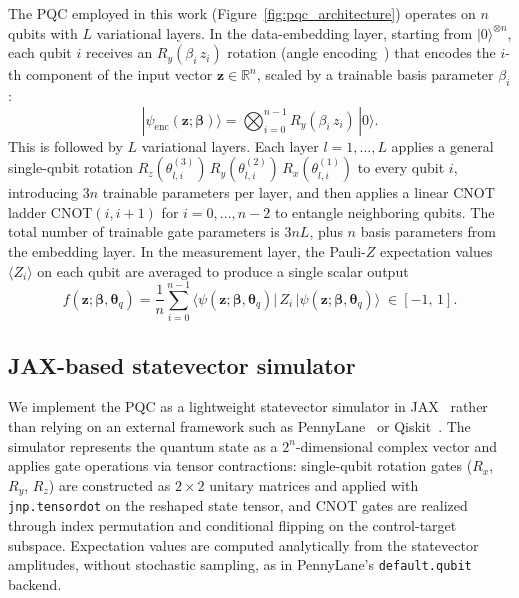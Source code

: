 \documentclass[11pt,a4paper]{article}
\begin{document}
The PQC employed in this work (Figure~\ref{fig:pqc_architecture}) operates on $n$ qubits with $L$ variational layers. In the data-embedding layer, starting from $|0\rangle^{\otimes n}$, each qubit $i$ receives an $R_y(\beta_i\, z_i)$ rotation (angle encoding~\citep{schuld2021machine}) that encodes the $i$-th component of the input vector $\mathbf{z} \in \mathbb{R}^n$, scaled by a trainable basis parameter $\beta_i$:
\begin{equation}
  |\psi_\mathrm{enc}(\mathbf{z};\boldsymbol{\beta})\rangle = \bigotimes_{i=0}^{n-1} R_y(\beta_i\, z_i)\,|0\rangle.
\end{equation}
This is followed by $L$ variational layers. Each layer $l = 1, \ldots, L$ applies a general single-qubit rotation $R_z(\theta^{(3)}_{l,i})\, R_y(\theta^{(2)}_{l,i})\, R_x(\theta^{(1)}_{l,i})$ to every qubit $i$, introducing $3n$ trainable parameters per layer, and then applies a linear CNOT ladder $\text{CNOT}(i, i{+}1)$ for $i = 0, \ldots, n{-}2$ to entangle neighboring qubits. The total number of trainable gate parameters is $3nL$, plus $n$ basis parameters from the embedding layer. In the measurement layer, the Pauli-$Z$ expectation values $\langle Z_i \rangle$ on each qubit are averaged to produce a single scalar output
\begin{equation}
  f(\mathbf{z}; \boldsymbol{\beta}, \boldsymbol{\theta}_q)
  = \frac{1}{n} \sum_{i=0}^{n-1} \langle\psi(\mathbf{z}; \boldsymbol{\beta}, \boldsymbol{\theta}_q)|\, Z_i \,|\psi(\mathbf{z}; \boldsymbol{\beta}, \boldsymbol{\theta}_q)\rangle
  \;\in [-1,\, 1].
  \label{eq:pqc_output}
\end{equation}

\subsection{JAX-based statevector simulator}
\label{sec:methods_statevector}

We implement the PQC as a lightweight statevector simulator in JAX~\citep{jax2018github} rather than relying on an external framework such as PennyLane~\citep{bergholm2022pennylaneautomaticdifferentiationhybrid} or Qiskit~\citep{javadiabhari2024quantumcomputingqiskit}. The simulator represents the quantum state as a $2^n$-dimensional complex vector and applies gate operations via tensor contractions: single-qubit rotation gates ($R_x$, $R_y$, $R_z$) are constructed as $2\!\times\!2$ unitary matrices and applied with \texttt{jnp.tensordot} on the reshaped state tensor, and CNOT gates are realized through index permutation and conditional flipping on the control-target subspace. Expectation values are computed analytically from the statevector amplitudes, without stochastic sampling, as in PennyLane's \texttt{default.qubit} backend.
\end{document}
